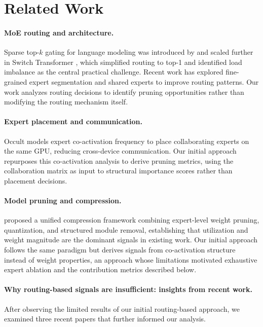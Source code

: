 \documentclass{article}
\begin{document}
\section{Related Work}

\paragraph{MoE routing and architecture.}
Sparse top-$k$ gating for language modeling was introduced by \citet{shazeer2017moe} and scaled further in Switch Transformer \citep{fedus2022switch}, which simplified routing to top-1 and identified load imbalance as the central practical challenge. Recent work has explored fine-grained expert segmentation \citep{deepseekai2024} and shared experts to improve routing patterns. Our work analyzes routing decisions to identify pruning opportunities rather than modifying the routing mechanism itself.

\paragraph{Expert placement and communication.}
Occult \citep{luo2025occult} models expert co-activation frequency to place collaborating experts on the same GPU, reducing cross-device communication. Our initial approach repurposes this co-activation analysis to derive pruning metrics, using the collaboration matrix as input to structural importance scores rather than placement decisions.

\paragraph{Model pruning and compression.}
\citet{he2024demystifying} proposed a unified compression framework combining expert-level weight pruning, quantization, and structured module removal, establishing that utilization and weight magnitude are the dominant signals in existing work. Our initial approach follows the same paradigm but derives signals from co-activation structure instead of weight properties, an approach whose limitations motivated exhaustive expert ablation and the contribution metrics described below.

\paragraph{Why routing-based signals are insufficient: insights from recent work.}
After observing the limited results of our initial routing-based approach, we examined three recent papers that further informed our analysis.
\end{document}
